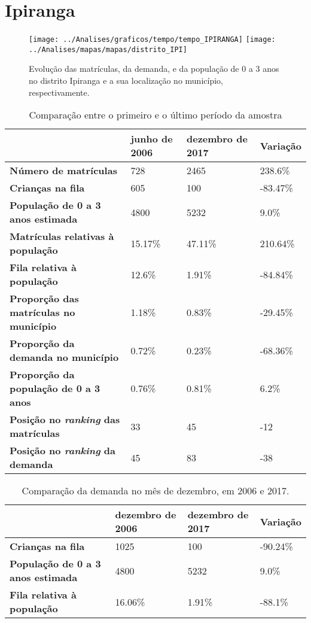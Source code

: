 \section{Ipiranga}
\begin{figure}[H]
\centering
\texttt{[image: ../Analises/graficos/tempo/tempo\_IPIRANGA]}
\texttt{[image: ../Analises/mapas/mapas/distrito\_IPI]}
\caption{Evolução das matrículas, da demanda, e da população de 0 a 3 anos no distrito Ipiranga e a sua localização no município, respectivamente.}
\end{figure}
\begin{table}[H]
\begin{tabular}{l|l|l|l}
\textbf{}                                      & \textbf{junho de 2006}       & \textbf{dezembro de 2017}    & \textbf{Variação} \\ \hline
\textbf{Número de matrículas}                  & 728 & 2465 & 238.6\% \\ \hline
\textbf{Crianças na fila}                      & 605 & 100 & -83.47\% \\ \hline
\textbf{População de 0 a 3 anos estimada}      & 4800 & 5232 & 9.0\% \\ \hline
\textbf{Matrículas relativas à população}      & 15.17\% & 47.11\% & 210.64\% \\ \hline
\textbf{Fila relativa à população}             & 12.6\% & 1.91\% & -84.84\% \\ \hline
\textbf{Proporção das matrículas no município} & 1.18\% & 0.83\% & -29.45\% \\ \hline
\textbf{Proporção da demanda no município}     & 0.72\% & 0.23\% & -68.36\% \\ \hline
\textbf{Proporção da população de 0 a 3 anos}  & 0.76\% & 0.81\% & 6.2\% \\ \hline
\textbf{Posição no \textit{ranking} das matrículas}     & 33 & 45 & -12 \\ \hline
\textbf{Posição no \textit{ranking} da demanda}         & 45 & 83 & -38 \\ 
\end{tabular}
\caption{Comparação entre o primeiro e o último período da amostra}
\end{table}
\begin{table}[H]
\begin{tabular}{l|l|l|l}
\textbf{}                                 & \textbf{dezembro de 2006} & \textbf{dezembro de 2017} & \textbf{Variação} \\ \hline
\textbf{Crianças na fila}                      & 1025 & 100 & -90.24\% \\ \hline
\textbf{População de 0 a 3 anos estimada}      & 4800 & 5232 & 9.0\% \\ \hline
\textbf{Fila relativa à população}             & 16.06\% & 1.91\% & -88.1\% \\
\end{tabular}
\caption{Comparação da demanda no mês de dezembro, em 2006 e 2017.}
\end{table}
